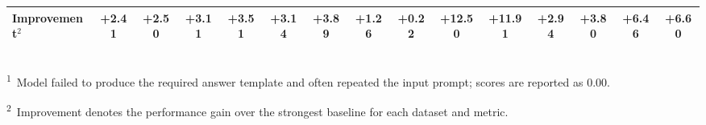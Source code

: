 \begin{table}[!t]
{\begin{tabular}{lcccccccccccc|cc}
\textbf{Improvement$^2$}
& \textbf{+2.41} & \textbf{+2.50}
& \textbf{+3.11} & \textbf{+3.51}
& \textbf{+3.14}  &  \textbf{+3.89}
& \textbf{+1.26}  & \textbf{+0.22}
& \textbf{+12.50}  & \textbf{+11.91}
& \textbf{+2.94}  & \textbf{+3.80}
& \textbf{+6.46}  & \textbf{+6.60}  \\
\bottomrule
\end{tabular}
}
{\footnotesize \raggedright \\
 \textsuperscript{1}\, Model failed to produce the required answer template and often repeated the input prompt; scores are reported as 0.00.\par
\textsuperscript{2}\, Improvement denotes the performance gain over the strongest baseline for each dataset and metric.\par
}
\vspace{-2pt}
\end{table}


